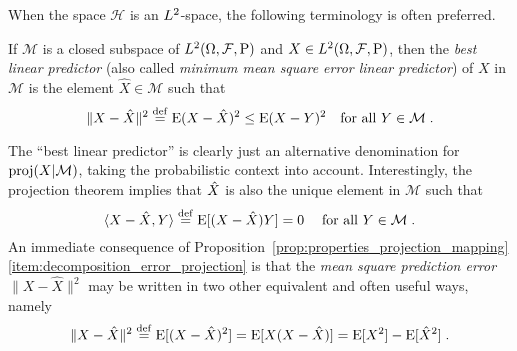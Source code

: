 When the space $\mathcal{H}$ is an $L^2$-space, the following
terminology is often preferred.

\begin{defi}
If $\mathcal{M}$ is a closed subspace of $L^2(\Omega,\mathcal{F},\operatorname{P})$
and $X \in L^2(\Omega,\mathcal{F},\operatorname{P})$, then the
\emph{best linear predictor}
(also called  \emph{minimum mean square error linear predictor})
of $X$ in $\mathcal{M}$ is the element $\hat{X} \in \mathcal{M}$ such that
$$
\| X - \hat{X} \|^2 \stackrel{\mathrm{def}}{=} \operatorname{E} (X - \hat{X} )^2 \leq \operatorname{E} (X - Y)^2
\quad \mbox{for all $Y \in \mathcal{M}$} \;.
$$
\end{defi}

The ``best linear predictor'' is clearly just an alternative denomination for
$\operatorname{proj}({X}|\mathcal{M})$, taking the probabilistic context into account.
Interestingly, the projection theorem implies that $\hat{X}$ is also the
unique element in $\mathcal{M}$ such that
$$
  \langle X-\hat{X}, Y \rangle \stackrel{\mathrm{def}}{=} \operatorname{E}[(X-\hat{X})Y] = 0 \;
  \quad \text{for all $Y \in \mathcal{M}$} \; .
  $$
  An immediate consequence of
  Proposition~\ref{prop:properties_projection_mapping}\ref{item:decomposition_error_projection} is that the
   \emph{mean square prediction error}
  $\|X-\hat{X}\|^2$ may be written in two other
  equivalent and often useful ways, namely
\begin{equation*}
  \|X-\hat{X}\|^2 \stackrel{\mathrm{def}}{=} \operatorname{E}[(X-\hat{X})^2] = \operatorname{E}[X(X-\hat{X})] = \operatorname{E}[X^2] - \operatorname{E}[\hat{X}^2] \; .
\end{equation*}

